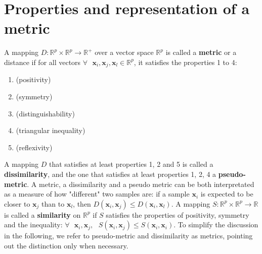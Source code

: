 \section{Properties and representation of a metric}
\label{sec:property_metric}

A mapping $D:\mathbb{R}^p \times \mathbb{R}^p \rightarrow \mathbb{R}^+$ over a vector space $\mathbb{R}^p$ is called a \textbf{metric} or a distance if for all vectors $\forall \textbf{ } \textbf{x}_i, \textbf{x}_j, \textbf{x}_l \in \mathbb{R}^p$, it satisfies the properties 1 to 4\cite{Deza2009}:
\begin{enumerate}
	\item { (positivity)}
	\item { (symmetry)}	
	\item { (distinguishability)}
	\item { (triangular inequality)}
	\item { (reflexivity)}
\end{enumerate}

\noindent A mapping $D$ that satisfies at least properties 1, 2 and 5 is called a \textbf{dissimilarity}, and the one that satisfies at least properties 1, 2, 4 a \textbf{pseudo-metric}. A metric, a dissimilarity and a pseudo metric can be both interpretated as a measure of how "different" two samples are: if a sample $\textbf{x}_i$ is expected to be closer to $\textbf{x}_j$ than to $\textbf{x}_l$, then $D(\textbf{x}_i,\textbf{x}_j) \leq D(\textbf{x}_i,\textbf{x}_l)$. 
A mapping $S:\mathbb{R}^p \times \mathbb{R}^p \rightarrow \mathbb{R}$ is called a \textbf{similarity} on $\mathbb{R}^p$ if $S$ satisfies the properties of positivity, symmetry and the inequality: $\forall \textbf{ } \textbf{x}_i, \textbf{x}_j, \textbf{ } S(\textbf{x}_i,\textbf{x}_j) \leq S(\textbf{x}_i,\textbf{x}_i)$.
To simplify the discussion in the following, we refer to pseudo-metric and dissimilarity as metrics, pointing out the distinction only when necessary.

